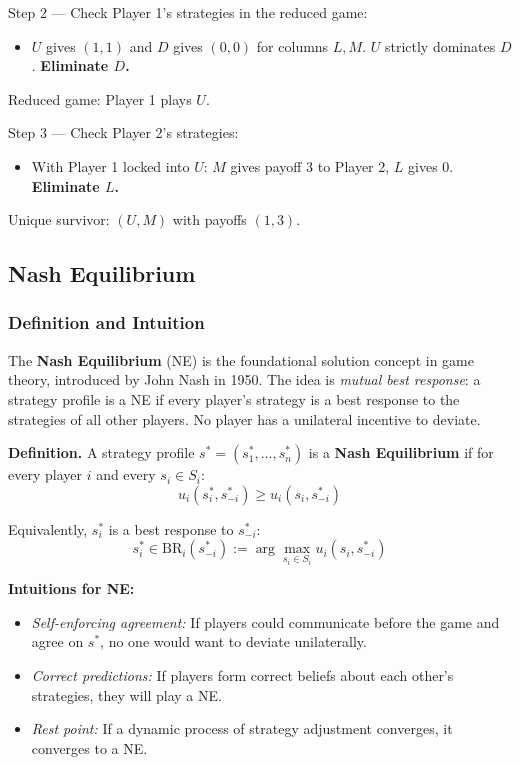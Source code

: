 \documentclass[hidelinks]{article}
\begin{document}
Step 2 — Check Player 1's strategies in the reduced game:
\begin{itemize}
    \item $U$ gives $(1,1)$ and $D$ gives $(0,0)$ for columns $L,M$. $U$ strictly dominates $D$. \textbf{Eliminate $D$.}
\end{itemize}

Reduced game: Player 1 plays $U$.

Step 3 — Check Player 2's strategies:
\begin{itemize}
    \item With Player 1 locked into $U$: $M$ gives payoff $3$ to Player 2, $L$ gives $0$. \textbf{Eliminate $L$.}
\end{itemize}

Unique survivor: $(U, M)$ with payoffs $(1,3)$.

\subsection{Nash Equilibrium}

\subsubsection{Definition and Intuition}

The \textbf{Nash Equilibrium} (NE) is the foundational solution concept in game theory, introduced by John Nash in 1950. The idea is \textit{mutual best response}: a strategy profile is a NE if every player's strategy is a best response to the strategies of all other players. No player has a unilateral incentive to deviate.

\textbf{Definition.} A strategy profile $s^* = (s_1^*, \ldots, s_n^*)$ is a \textbf{Nash Equilibrium} if for every player $i$ and every $s_i \in S_i$:
\[
u_i(s_i^*, s_{-i}^*) \geq u_i(s_i, s_{-i}^*)
\]

Equivalently, $s_i^*$ is a best response to $s_{-i}^*$:
\[
s_i^* \in \mathrm{BR}_i(s_{-i}^*) := \arg\max_{s_i \in S_i} u_i(s_i, s_{-i}^*)
\]

\textbf{Intuitions for NE:}
\begin{itemize}
    \item \textit{Self-enforcing agreement:} If players could communicate before the game and agree on $s^*$, no one would want to deviate unilaterally.
    \item \textit{Correct predictions:} If players form correct beliefs about each other's strategies, they will play a NE.
    \item \textit{Rest point:} If a dynamic process of strategy adjustment converges, it converges to a NE.
\end{itemize}
\end{document}
